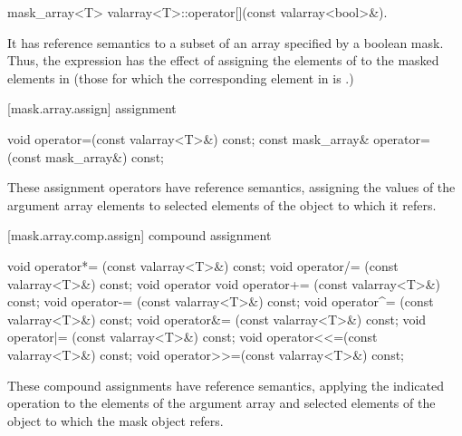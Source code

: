 %
\begin{itemdecl}
mask_array<T> valarray<T>::operator[](const valarray<bool>&).
\end{itemdecl}

\pnum
It has reference semantics to a subset of an array specified by a boolean mask.
Thus, the expression
has the effect of assigning the elements of
to the masked
elements in
(those for which the corresponding element
in
is
.)

[mask.array.assign]{ assignment}

%
\begin{itemdecl}
void operator=(const valarray<T>&) const;
const mask_array& operator=(const mask_array&) const;
\end{itemdecl}

\begin{itemdescr}
\pnum
These assignment operators have reference semantics, assigning the values
of the argument array elements to selected elements of the
object to which it refers.
\end{itemdescr}

[mask.array.comp.assign]{ compound assignment}

%
%
%
%
%
%
%
%
%
%
\begin{itemdecl}
void operator*= (const valarray<T>&) const;
void operator/= (const valarray<T>&) const;
void operator%
void operator+= (const valarray<T>&) const;
void operator-= (const valarray<T>&) const;
void operator^= (const valarray<T>&) const;
void operator&= (const valarray<T>&) const;
void operator|= (const valarray<T>&) const;
void operator<<=(const valarray<T>&) const;
void operator>>=(const valarray<T>&) const;
\end{itemdecl}

\begin{itemdescr}
\pnum
These compound assignments have reference semantics, applying the
indicated operation to the elements of the argument array and selected elements
of the
object to which the mask object refers.
\end{itemdescr}

